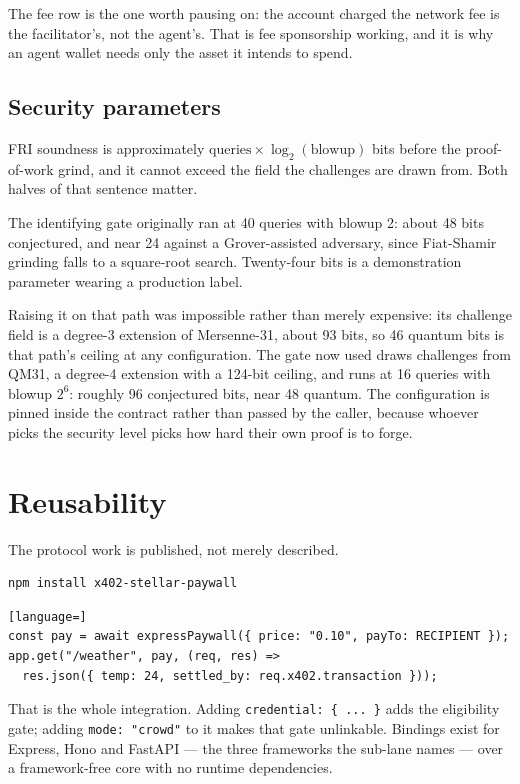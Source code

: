 \documentclass[11pt,a4paper]{article}
\begin{document}
The fee row is the one worth pausing on: the account charged the network fee is
the facilitator's, not the agent's. That is fee sponsorship working, and it is
why an agent wallet needs only the asset it intends to spend.

\subsection{Security parameters}

FRI soundness is approximately $\text{queries} \times \log_2(\text{blowup})$
bits before the proof-of-work grind, and it cannot exceed the field the
challenges are drawn from. Both halves of that sentence matter.

The identifying gate originally ran at 40 queries with blowup 2: about 48 bits
conjectured, and near 24 against a Grover-assisted adversary, since Fiat-Shamir
grinding falls to a square-root search. Twenty-four bits is a demonstration
parameter wearing a production label.

Raising it on that path was impossible rather than merely expensive: its
challenge field is a degree-3 extension of Mersenne-31, about 93 bits, so 46
quantum bits is that path's ceiling at any configuration. The gate now used
draws challenges from QM31, a degree-4 extension with a 124-bit ceiling, and
runs at 16 queries with blowup $2^6$: roughly 96 conjectured bits, near 48
quantum. The configuration is pinned inside the contract rather than passed by
the caller, because whoever picks the security level picks how hard their own
proof is to forge.

\section{Reusability}

The protocol work is published, not merely described.

\begin{lstlisting}
npm install x402-stellar-paywall
\end{lstlisting}

\begin{lstlisting}[language=]
const pay = await expressPaywall({ price: "0.10", payTo: RECIPIENT });
app.get("/weather", pay, (req, res) =>
  res.json({ temp: 24, settled_by: req.x402.transaction }));
\end{lstlisting}

That is the whole integration. Adding \texttt{credential: \{ ... \}} adds the
eligibility gate; adding \texttt{mode: "crowd"} to it makes that gate
unlinkable. Bindings exist for Express, Hono and FastAPI --- the three
frameworks the sub-lane names --- over a framework-free core with no runtime
dependencies.
\end{document}
